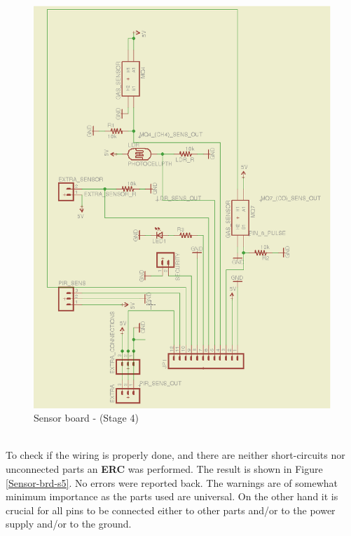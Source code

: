 \documentclass[12pt,a4paper,draft]{report}
\begin{document}
\begin{figure}[H]
\centering
\includegraphics*[scale=0.25]{sens_brd_s4}
\caption{Sensor board -  (Stage 4)}
\label{Sensor-brd-s4} 
\end{figure}
\ \\
To check if the wiring is properly done, and there are neither short-circuits nor unconnected parts an \textbf{ERC} was performed.
The result is shown in Figure \ref{Sensor-brd-s5}.
No errors were reported back.
The warnings are of somewhat minimum importance as the parts used are universal.
On the other hand it is crucial for all pins to be connected either to other parts and/or to the power supply and/or to the ground.
\ \\
\end{document}
